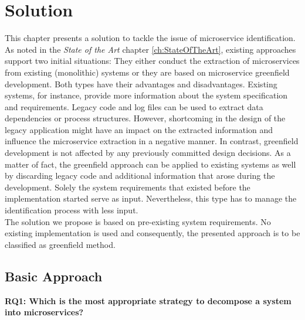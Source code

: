 \chapter{Solution}
\label{ch:Solution}
This chapter presents a solution to tackle the issue of microservice identification. As noted in the \textit{State of the Art} chapter \ref{ch:StateOfTheArt}, existing approaches support two initial situations: They either conduct the extraction of microservices from existing (monolithic) systems or they are based on microservice greenfield development. Both types have their advantages and disadvantages. Existing systems, for instance, provide more information about the system specification and requirements. Legacy code and log files can be used to extract data dependencies or process structures. However, shortcoming in the design of the legacy application might have an impact on the extracted information and influence the microservice extraction in a negative manner. In contrast, greenfield development is not affected by any previously committed design decisions. As a matter of fact, the greenfield approach can be applied to existing systems as well by discarding legacy code and additional information that arose during the development. Solely the system requirements that existed before the implementation started serve as input. Nevertheless, this type has to manage the identification process with less input.\\
The solution we propose is based on pre-existing system requirements. No existing implementation is used and consequently, the presented approach is to be classified as greenfield method.\\



\section{Basic Approach}


\vspace{0.5cm}
\par
\begingroup
\leftskip=1cm
\rightskip=1cm

\noindent
\textbf{RQ1: Which is the most appropriate strategy to decompose a system into microservices? }

\endgroup
\vspace{0.5cm}



